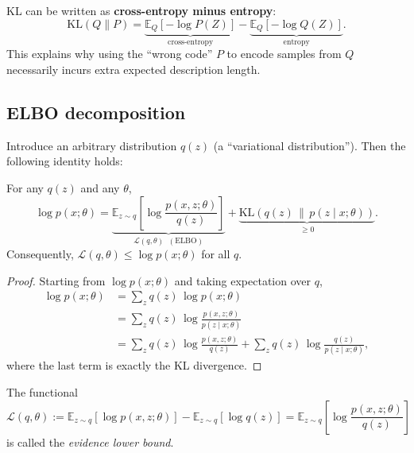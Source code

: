 \documentclass[../main]{subfiles}
\begin{document}
\begin{remark}
    KL can be written as \textbf{cross-entropy minus entropy}:
    \begin{equation}
        \mathrm{KL}(Q\|P)
        =
        \underbrace{\mathbb E_Q[-\log P(Z)]}_{\text{cross-entropy}}
        -
        \underbrace{\mathbb E_Q[-\log Q(Z)]}_{\text{entropy}}.
    \end{equation}
    This explains why using the ``wrong code'' $P$ to encode samples from $Q$
    necessarily incurs extra expected description length.
\end{remark}

\subsection{ELBO decomposition}
Introduce an arbitrary distribution $q(z)$ (a ``variational distribution'').
Then the following identity holds:
\begin{theorem}\label{thm:elbo}
    For any $q(z)$ and any $\theta$,
    \begin{equation}\label{eq:elbo-decomp}
        \log p(x;\theta)
        =
        \underbrace{
        \mathbb E_{z\sim q}\!\left[\log \frac{p(x,z;\theta)}{q(z)}\right]
        }_{\mathcal L(q,\theta)\;\;(\text{ELBO})}
        +
        \underbrace{
        \mathrm{KL}\!\left(q(z)\,\middle\|\,p(z\mid x;\theta)\right)
        }_{\ge 0}.
    \end{equation}
    Consequently, $\mathcal L(q,\theta)\le \log p(x;\theta)$ for all $q$.
\end{theorem}
\begin{proof}
    Starting from $\log p(x;\theta)$ and taking expectation over $q$,
    \begin{align*}
        \log p(x;\theta)
        &= \sum_z q(z)\,\log p(x;\theta) \\
        &= \sum_z q(z)\,\log \frac{p(x,z;\theta)}{p(z\mid x;\theta)} \\
        &= \sum_z q(z)\,\log \frac{p(x,z;\theta)}{q(z)}
        + \sum_z q(z)\,\log \frac{q(z)}{p(z\mid x;\theta)},
    \end{align*}
    where the last term is exactly the KL divergence.
\end{proof}

\begin{definition}
    The functional
    \begin{equation}
        \mathcal L(q,\theta)
        :=
        \mathbb E_{z\sim q}\!\left[\log p(x,z;\theta)\right]
        -
        \mathbb E_{z\sim q}\!\left[\log q(z)\right]
        =
        \mathbb E_{z\sim q}\!\left[\log \frac{p(x,z;\theta)}{q(z)}\right]
    \end{equation}
    is called the \emph{evidence lower bound}.
\end{definition}
\end{document}
